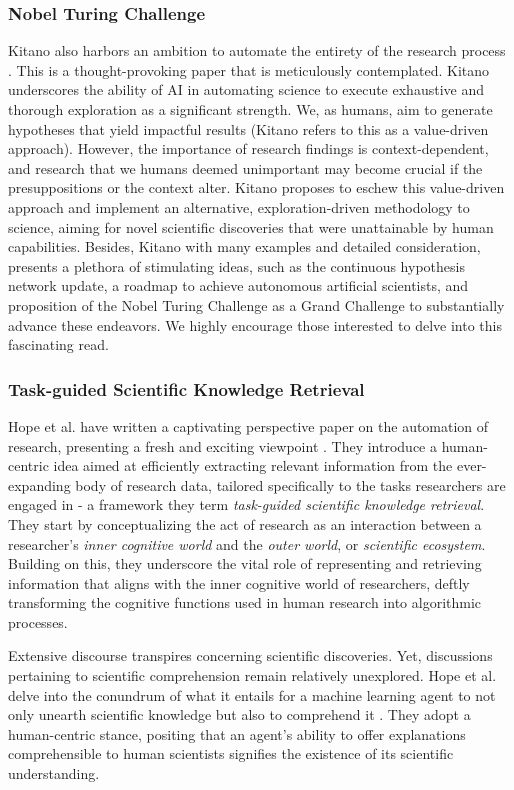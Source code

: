 \subsubsection{Nobel Turing Challenge}
Kitano also harbors an ambition to automate the entirety of the research process \cite{kitano2021nobel}. This is a thought-provoking paper that is meticulously contemplated. Kitano underscores the ability of AI in automating science to execute exhaustive and thorough exploration as a significant strength. We, as humans, aim to generate hypotheses that yield impactful results (Kitano refers to this as a value-driven approach). However, the importance of research findings is context-dependent, and research that we humans deemed unimportant may become crucial if the presuppositions or the context alter. Kitano proposes to eschew this value-driven approach and implement an alternative, exploration-driven methodology to science, aiming for novel scientific discoveries that were unattainable by human capabilities. Besides, Kitano with many examples and detailed consideration, presents a plethora of stimulating ideas, such as the continuous hypothesis network update, a roadmap to achieve autonomous artificial scientists, and proposition of the Nobel Turing Challenge as a Grand Challenge to substantially advance these endeavors. We highly encourage those interested to delve into this fascinating read.

\subsubsection{Task-guided Scientific Knowledge Retrieval}
Hope et al. have written a captivating perspective paper on the automation of research, presenting a fresh and exciting viewpoint \cite{hope2022computational}. They introduce a human-centric idea aimed at efficiently extracting relevant information from the ever-expanding body of research data, tailored specifically to the tasks researchers are engaged in - a framework they term \textit{task-guided scientific knowledge retrieval}. They start by conceptualizing the act of research as an interaction between a researcher's \textit{inner cognitive world} and the \textit{outer world}, or \textit{scientific ecosystem}. Building on this, they underscore the vital role of representing and retrieving information that aligns with the inner cognitive world of researchers, deftly transforming the cognitive functions used in human research into algorithmic processes.

Extensive discourse transpires concerning scientific discoveries. Yet, discussions pertaining to scientific comprehension remain relatively unexplored. Hope et al. delve into the conundrum of what it entails for a machine learning agent to not only unearth scientific knowledge but also to comprehend it \cite{krenn2022scientific}. They adopt a human-centric stance, positing that an agent's ability to offer explanations comprehensible to human scientists signifies the existence of its scientific understanding.

